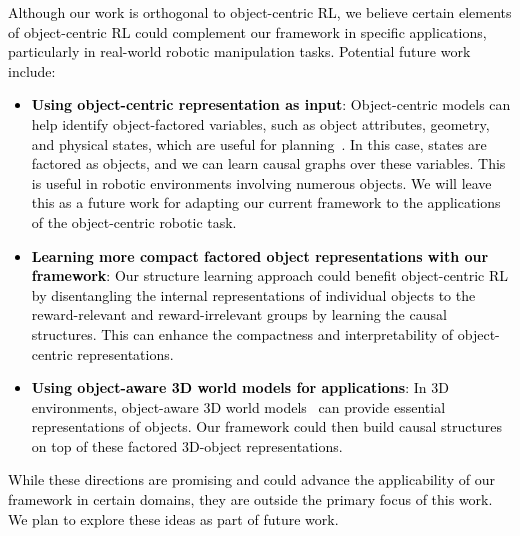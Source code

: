 \textcolor{black}{Although our work is orthogonal to object-centric RL, we believe certain elements of object-centric RL could complement our framework in specific applications, particularly in real-world robotic manipulation tasks. Potential future work include:
\begin{itemize}
    \item \textbf{Using object-centric representation as input}: Object-centric models can help identify object-factored variables, such as object attributes, geometry, and physical states, which are useful for planning~\citep{jiang2019scalor,lin2020improving,kossen2019structured, mambelli2022compositional,feng2023learning, choi2024unsupervised, zadaianchuk2022self, park2021object, zadaianchuk2020self, yuan2022sornet, li2020towards, mitash2024scaling, haramati2024entity, li2024manipllm}. In this case, states are factored as objects, and we can learn causal graphs over these variables. This is useful in robotic environments involving numerous objects. We will leave this as a future work for adapting our current framework to the applications of the object-centric robotic task. 
    \item \textbf{Learning more compact factored object representations with our framework}: Our structure learning approach could benefit object-centric RL by disentangling the internal representations of individual objects to the reward-relevant and reward-irrelevant groups by learning the causal structures. This can enhance the compactness and interpretability of object-centric representations.
    \item \textbf{Using object-aware 3D world models for applications}: In 3D environments, object-aware 3D world models~\citep{li2024objectaware} can provide essential representations of objects. Our framework could then build causal structures on top of these factored 3D-object representations.
\end{itemize}
}

\textcolor{black}{While these directions are promising and could advance the applicability of our framework in certain domains, they are outside the primary focus of this work. We plan to explore these ideas as part of future work.}


